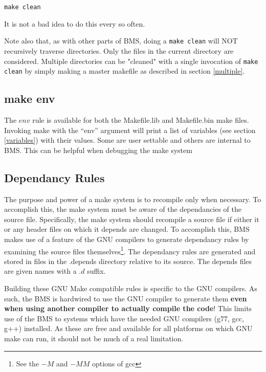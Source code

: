 \documentclass[12pt]{article}
\begin{document}
\begin{lstlisting}[frame=single,backgroundcolor=\color{cmdbkgd}]
make clean
\end{lstlisting}

It is not a bad idea to do this every so often.

Note also that, as with other parts of BMS, doing a 
{\lstinline !make clean!}
will NOT recursively traverse directories. Only the files in
the current directory are considered. Multiple directories
can be "cleaned" with a single invocation of {\lstinline !make clean!}
by simply making a master makefile as described in section
\ref{multiple}.

\subsection{make env}
The $env$ rule is available for both the Makefile.lib and 
Makefile.bin make files. Invoking make with the ``env''
argument will print a list of variables (see section 
\ref{variables}) with their values. Some are user settable and
others are internal to BMS. This can be helpful when debugging
the make system

\subsection{Dependancy Rules}
\label{depends}
The purpose and power of a make system is to recompile only when
necessary. To accomplish this, the make system must be aware of
the dependancies of the source file. Specifically, the make system
should recompile a source file if either it or any header files
on which it depends are changed. To accomplish this, BMS makes use
of a feature of the GNU compilers to generate dependancy rules
by examining the source files themselves\footnote{See the $-M$
and $-MM$ options of gcc}. The dependancy rules are generated and
stored in files in the .depends directory relative to its source.
The depends files are given names with a $.d$ suffix.

Building these GNU Make compatible rules is specific to the GNU
compilers. As such, the BMS is hardwired to use the GNU compiler
to generate them {\bf even when using another compiler to actually
compile the code}! This limits use of the BMS to systems which have
the needed GNU compilers (g77, gcc, g++) installed. As these are
free and available for all platforms on which GNU make can run,
it should not be much of a real limitation.
\end{document}
